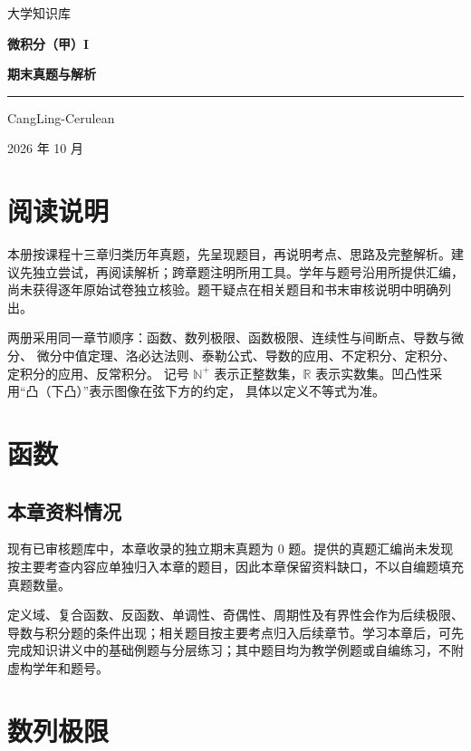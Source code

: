 \documentclass[UTF8,fontset=fandol,12pt,oneside,openany]{ctexrep}
\newcommand{\R}{\mathbb R}
\newcommand{\N}{\mathbb N^{+}}
\theoremstyle{definition}
\begin{document}
\begin{titlepage}
\centering
\vspace*{28mm}
{\Large 大学知识库\par}
\vspace{15mm}
{\Huge\bfseries 微积分（甲）I\par}
\vspace{12mm}
{\LARGE\bfseries 期末真题与解析\par}
\vspace{12mm}
\rule{.65\textwidth}{.5pt}
\vfill
{\large CangLing-Cerulean\par}
\vspace{5mm}
{2026 年 10 月\par}
\vspace*{18mm}
\end{titlepage}
\chapter*{阅读说明}
本册按课程十三章归类历年真题，先呈现题目，再说明考点、思路及完整解析。建议先独立尝试，再阅读解析；跨章题注明所用工具。学年与题号沿用所提供汇编，尚未获得逐年原始试卷独立核验。题干疑点在相关题目和书末审核说明中明确列出。

两册采用同一章节顺序：函数、数列极限、函数极限、连续性与间断点、导数与微分、
微分中值定理、洛必达法则、泰勒公式、导数的应用、不定积分、定积分、定积分的应用、反常积分。
记号 $\N$ 表示正整数集，$\R$ 表示实数集。凹凸性采用“凸（下凸）”表示图像在弦下方的约定，
具体以定义不等式为准。

\tableofcontents
\clearpage
{}
\chapter{函数}
\label{exam:01:chapter}
\section{本章资料情况}
现有已审核题库中，本章收录的独立期末真题为 $0$ 题。提供的真题汇编尚未发现按主要考查内容应单独归入本章的题目，因此本章保留资料缺口，不以自编题填充真题数量。

定义域、复合函数、反函数、单调性、奇偶性、周期性及有界性会作为后续极限、导数与积分题的条件出现；相关题目按主要考点归入后续章节。学习本章后，可先完成知识讲义中的基础例题与分层练习；其中题目均为教学例题或自编练习，不附虚构学年和题号。


\chapter{数列极限}
\label{exam:02:chapter}
\end{document}
